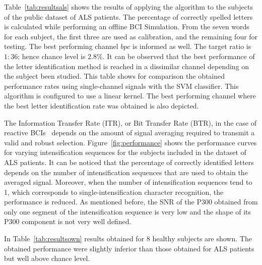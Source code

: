 \documentclass[utf8]{frontiersSCNS} %
\begin{document}
Table~\ref{tab:resultsals} shows the results of applying the algorithm to the subjects of the public dataset of ALS patients. The percentage of correctly spelled letters is calculated while performing an offline BCI Simulation.  From the seven words for each subject, the first three are used as calibration, and the remaining four for testing.  The best performing channel  $bpc$ is informed as well. The target ratio is $1:36$; hence chance level is $2.8\%$. It can be observed that the best performance of the letter identification method is reached in a dissimilar channel depending on the subject been studied.  This table shows for comparison the obtained performance rates using single-channel signals with the SVM\citep{Scholkopf2001}  classifier.  This algorithm is configured to use a linear kernel.  The best performing channel where the best letter identification rate was obtained is also depicted.


The Information Transfer Rate (ITR), or Bit Transfer Rate (BTR), in the case of reactive BCIs~\citep{WolpawJonathanR2012}  depends on the amount of signal averaging required to transmit a valid and robust selection.  Figure~\ref{fig:performance} shows the performance curves for varying intensification sequences for the subjects included in the dataset of ALS patients. It can be noticed that the percentage of correctly identified letters depends on the number of intensification sequences that are used to obtain the averaged signal.  Moreover, when the number of intensification sequences tend to 1, which corresponds to single-intensification character recognition, the performance is reduced. As mentioned before, the SNR of the P300 obtained from only one segment of the intensification sequence is very low and the shape of its P300 component is not very well defined.

In Table~\ref{tab:resultsown} results obtained for 8 healthy subjects are shown.  The obtained performance were slightly inferior than those obtained for ALS patients but well above chance level. 

\end{document}
